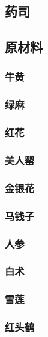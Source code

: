 \documentclass[12pt,a4paper,landscape]{article}
\begin{document}
\begin{CJK}{UTF8}{gbsn}
\section{药司}

\subsection{原材料}
\subsubsection{牛黄}
\subsubsection{绿麻}
\subsubsection{红花}
\subsubsection{美人罂}
\subsubsection{金银花}
\subsubsection{马钱子}
\subsubsection{人参}
\subsubsection{白术}
\subsubsection{雪莲}
\subsubsection{红头鹤}


\end{CJK}
\end{document}
